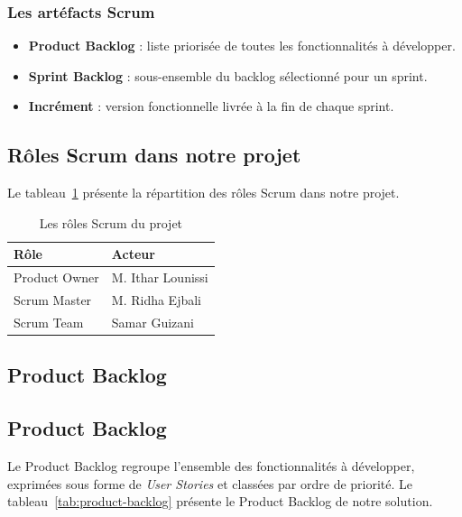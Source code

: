 \documentclass[12pt, oneside, a4paper]{report}
\begin{document}
\subsubsection{Les artéfacts Scrum}
\begin{itemize}
    \item \textbf{Product Backlog} : liste priorisée de toutes les fonctionnalités à développer.
    \item \textbf{Sprint Backlog} : sous-ensemble du backlog sélectionné pour un sprint.
    \item \textbf{Incrément} : version fonctionnelle livrée à la fin de chaque sprint.
\end{itemize}

\subsection{Rôles Scrum dans notre projet}
Le tableau~\ref{tab:roles-scrum} présente la répartition des rôles Scrum dans notre projet.

\begin{table}[H]
\centering
\caption{Les rôles Scrum du projet}
\label{tab:roles-scrum}
\vspace{0.3cm}
\renewcommand{\arraystretch}{1.3}
\begin{tabular}{|l|l|}
\hline
\textbf{Rôle} & \textbf{Acteur} \\
\hline
Product Owner & M. Ithar Lounissi  \\
\hline
Scrum Master & M. Ridha Ejbali  \\
\hline
Scrum Team & Samar Guizani  \\
\hline
\end{tabular}
\end{table}

\subsection{Product Backlog}
\subsection{Product Backlog}
Le Product Backlog regroupe l'ensemble des fonctionnalités à développer, exprimées sous forme de \textit{User Stories} et classées par ordre de priorité. Le tableau~\ref{tab:product-backlog} présente le Product Backlog de notre solution.
\end{document}
